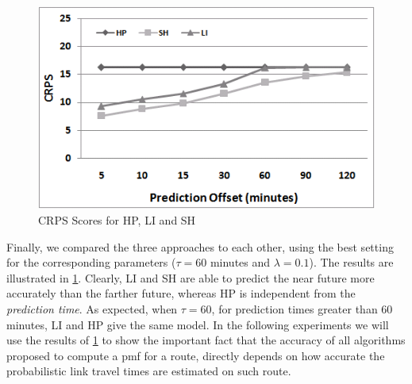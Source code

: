 \begin{figure}[h]
	\centering
	\includegraphics[width = 0.6\columnwidth]{figures/Links_Best.png}
	\caption{CRPS Scores for HP, LI and SH}\label{fig:all_results}
\end{figure}

Finally, we compared the three approaches to each other, using the best setting for the corresponding parameters ($\tau = 60$ minutes and $\lambda = 0.1$). The results are illustrated in \cref{fig:all_results}. Clearly, LI and SH are able to predict the near future more accurately than the farther future, whereas HP is independent from the \textit{prediction time}. As expected, when $\tau = 60$, for prediction times greater than 60 minutes, LI and HP give the same model. In the following experiments we will use the results of \cref{fig:all_results} to show the important fact that the accuracy of all algorithms proposed to compute a pmf for a route, directly depends on how accurate the probabilistic link travel times are estimated on such route.


